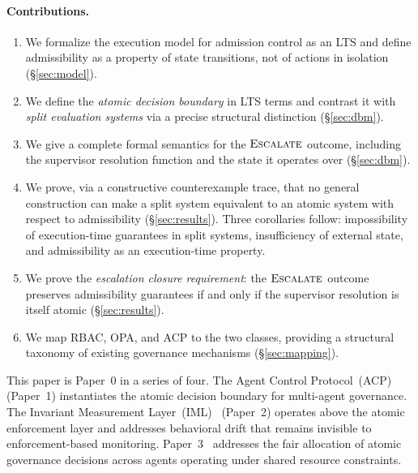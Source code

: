 \documentclass[11pt]{article}
\theoremstyle{plain}
\theoremstyle{definition}
\theoremstyle{remark}
\newcommand{\Escalate}{\textsc{Escalate}}
\begin{document}
\paragraph{Contributions.}
\begin{enumerate}[label=\normalfont(\roman*)]
  \item We formalize the execution model for admission control as an LTS and
    define admissibility as a property of state transitions, not of actions
    in isolation (\S\ref{sec:model}).

  \item We define the \emph{atomic decision boundary} in LTS terms and
    contrast it with \emph{split evaluation systems} via a precise structural
    distinction (\S\ref{sec:dbm}).

  \item We give a complete formal semantics for the $\Escalate$ outcome,
    including the supervisor resolution function and the state it operates
    over (\S\ref{sec:dbm}).

  \item We prove, via a constructive counterexample trace, that no general
    construction can make a split system equivalent to an atomic system with
    respect to admissibility (\S\ref{sec:results}).  Three corollaries
    follow: impossibility of execution-time guarantees in split systems,
    insufficiency of external state, and admissibility as an execution-time
    property.

  \item We prove the \emph{escalation closure requirement}: the $\Escalate$
    outcome preserves admissibility guarantees if and only if the supervisor
    resolution is itself atomic (\S\ref{sec:results}).

  \item We map RBAC, OPA, and ACP to the two classes, providing a structural
    taxonomy of existing governance mechanisms (\S\ref{sec:mapping}).
\end{enumerate}

This paper is Paper~0 in a series of four.  The Agent Control Protocol~(ACP)~\cite{acp26}
(Paper~1) instantiates the atomic decision boundary for multi-agent governance.
The Invariant Measurement Layer~(IML)~\cite{iml26} (Paper~2) operates above the
atomic enforcement layer and addresses behavioral drift that remains invisible
to enforcement-based monitoring.  Paper~3~\cite{fairgov26} addresses the fair allocation of atomic governance
decisions across agents operating under shared resource constraints.
\end{document}
